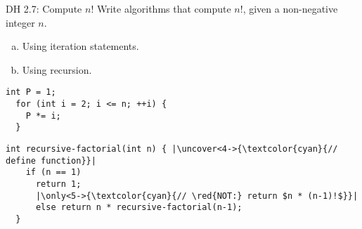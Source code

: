 \begin{frame}[fragile]{}
  \begin{exampleblock}{DH 2.7: Compute $n!$}
    Write algorithms that compute $n!$, given a non-negative integer $n$.
    \begin{enumerate}[(a)]
      \item Using iteration statements.
      \item Using recursion.
    \end{enumerate}
  \end{exampleblock}

  \pause
  \begin{lstlisting}[style = Cstyle]
  int P = 1;
  for (int i = 2; i <= n; ++i) {
    P *= i;
  }
  \end{lstlisting}

  \pause
  \begin{lstlisting}[style = Cstyle]
  int recursive-factorial(int n) { |\uncover<4->{\textcolor{cyan}{// define function}}|
    if (n == 1)
      return 1;
      |\only<5->{\textcolor{cyan}{// \red{NOT:} return $n * (n-1)!$}}|
      else return n * recursive-factorial(n-1); 
  }
  \end{lstlisting}
\end{frame}
